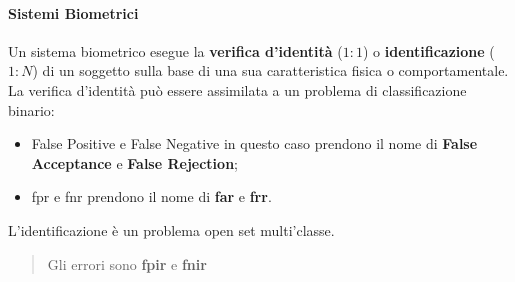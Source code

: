 \paragraph{Sistemi Biometrici}\label{par:sistemi_biometrici} %
Un sistema biometrico esegue la \textbf{verifica d'identità} ($1:1$) o \textbf{identificazione} ($1:N$) di un soggetto sulla base di una sua caratteristica fisica o comportamentale.
La verifica d'identità può essere assimilata a un problema di classificazione binario:
\begin{itemize}
    \item False Positive e False Negative in questo caso prendono il nome di \textbf{False Acceptance} e \textbf{False Rejection};
    \item \ac{fpr} e \ac{fnr} prendono il nome di \textbf{\ac{far}} e \textbf{\ac{frr}}.
\end{itemize}
L'identificazione è un problema open set multi'classe.
\begin{quote}
    Gli errori sono \textbf{\ac{fpir}} e \textbf{\ac{fnir}}
\end{quote}
%
